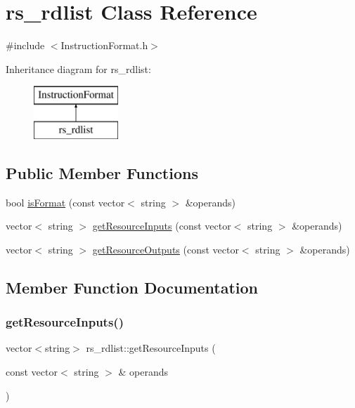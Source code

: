 \hypertarget{classrs__rdlist}{}\section{rs\+\_\+rdlist Class Reference}
\label{classrs__rdlist}


{\ttfamily \#include $<$Instruction\+Format.\+h$>$}

Inheritance diagram for rs\+\_\+rdlist\+:\begin{figure}[H]
\begin{center}
\leavevmode
\includegraphics[height=2.000000cm]{classrs__rdlist}
\end{center}
\end{figure}
\subsection*{Public Member Functions}
\begin{DoxyCompactItemize}
\item 
bool \hyperlink{classrs__rdlist_a3bf959757fd3abfc635485e85471dce4}{is\+Format} (const vector$<$ string $>$ \&operands)
\item 
vector$<$ string $>$ \hyperlink{classrs__rdlist_a52adf024855b236f038cc7140b9f5cc9}{get\+Resource\+Inputs} (const vector$<$ string $>$ \&operands)
\item 
vector$<$ string $>$ \hyperlink{classrs__rdlist_acb2773ca764d509fe6acaeaf83064b90}{get\+Resource\+Outputs} (const vector$<$ string $>$ \&operands)
\end{DoxyCompactItemize}


\subsection{Member Function Documentation}
\mbox{\label{classrs__rdlist_a52adf024855b236f038cc7140b9f5cc9}} 
\subsubsection{\texorpdfstring{get\+Resource\+Inputs()}{getResourceInputs()}}
{\footnotesize\ttfamily vector$<$string$>$ rs\+\_\+rdlist\+::get\+Resource\+Inputs (\begin{DoxyParamCaption}\item[{const vector$<$ string $>$ \&}]{operands }\end{DoxyParamCaption})\hspace{0.3cm}{\ttfamily [virtual]}}

